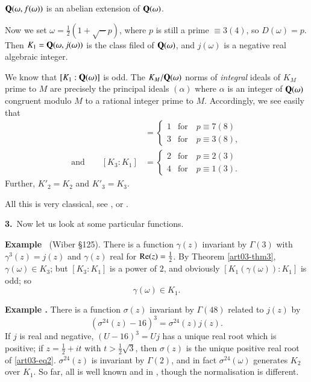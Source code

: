 \eject

\begin{coro*}
$\mathbf{Q}(\omega,f(\omega))$ is an abelian extension of $\mathbf{Q}(\omega)$.
\end{coro*}

Now we set $\omega=\frac{1}{2}(1+\surd-p)$, where $p$ is still a prime $\equiv 3(4)$, so $D(\omega)=p$. Then $K_{1}=\mathbf{Q}(\omega,j(\omega))$ is the class filed of $\mathbf{Q}(\omega)$, and $j(\omega)$ is a negative real algebraic integer.

We know that $[K_{1}:\mathbf{Q}(\omega)]$ is odd. The $K_{M}/\mathbf{Q}(\omega)$ norms of {\em integral} ideals of $K_{M}$ prime to $M$ are precisely the principal ideals $(\alpha)$ where $\alpha$ is an integer of $\mathbf{Q}(\omega)$ congruent modulo $M$ to a rational integer prime to $M$. Accordingly, we see easily that
\begin{align*}
[K_{2}:K_{1}] &= 
\begin{cases}
1 & \text{for~~ } p\equiv 7(8)\\[4pt]
3 & \text{for~~ } p\equiv 3(8),
\end{cases}\\
\text{and}\qquad [K_{3}:K_{1}] &=
\begin{cases}
2 & \text{for~~ } p\equiv 2(3)\\[4pt]
4 & \text{for~~ } p\equiv 1(3).
\end{cases}
\end{align*}
Further, $K'_{2}=K_{2}$ and $K'_{3}=K_{3}$.

All this is very classical, see \cite{art03-key9}, \cite{art03-key6} or \cite{art03-key3}.

\medskip
\noindent
{\bf 3.}~Now let us look at some particular functions.

\medskip
\noindent
{\bf Example \label{art03-exam1}}~(Wiber \cite{art03-key9} \S125).
There is a function $\gamma(z)$ invariant by $\Gamma(3)$ with $\gamma^{3}(z)=j(z)$ and $\gamma(z)$ real for $\operatorname{\mathrm{Re}}(z)=\frac{1}{2}$. By Theorem \ref{art03-thm3}, $\gamma(\omega)\in K_{3}$; but $[K_{3}:K_{1}]$ is a power of $2$, and obviously $[K_{1}(\gamma(\omega)):K_{1}]$ is odd; so
\begin{equation*}
\gamma(\omega)\in K_{1}.\tag{1}\label{art03-eq1}
\end{equation*}

\medskip
\noindent
{\bf Example .\label{art03-exam2}}
There is a function $\sigma(z)$ invariant by $\Gamma(48)$ related to $j(z)$ by
\begin{equation*}
(\sigma^{24}(z)-16)^{3}=\sigma^{24}(z)j(z).\tag{2}\label{art03-eq2}
\end{equation*}
If $j$ is real and negative, $(U-16)^{3}=Uj$ has a unique real root which is positive; if $z=\frac{1}{2}+it$ with $t>\frac{1}{2}\surd 3$, then $\sigma(z)$ is the unique positive real root of \eqref{art03-eq2}. $\sigma^{24}(z)$ is invariant by $\Gamma(2)$, and in fact $\sigma^{24}(\omega)$ generates $K_{2}$ over $K_{1}$. So far, all is well known and in \cite{art03-key9}, though the normalisation is different.
\smallskip


